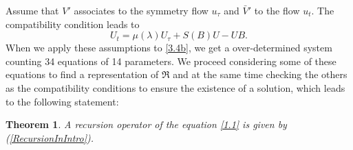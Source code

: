 \documentclass{article}
\numberwithin{equation}{section}
\newtheorem{theorem}{Theorem}[section]
\begin{document}
Assume that $V'$ associates to the symmetry flow $u_{\tau}$ and $\bar V'$ to the flow $u_t$.
The compatibility condition leads to
	\begin{equation}
		U_t = \mu(\lambda) U_\tau + S(B) U - U B .
		\label{3.4b}
	\end{equation}
	When we apply these assumptions to \eqref{3.4b}, we get a over-determined system counting 
34 equations of 14 parameters. We proceed considering some of these equations to find a 
representation of $\mathfrak{R}$ and at the same time checking the others as the 
compatibility conditions to ensure the existence of a solution, which leads to the following statement:
	\begin{theorem}\label{theo2}
		A recursion operator of the equation \eqref{1.1} is given by (\ref{RecursionInIntro}).

	\end{theorem}
\end{document}
